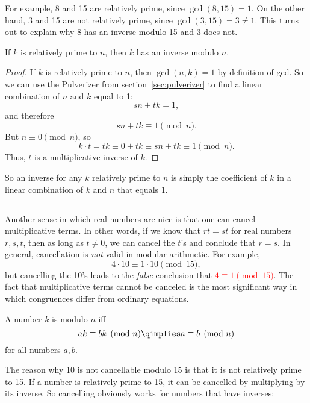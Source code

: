For example, 8 and 15 are relatively prime, since $\gcd(8, 15) = 1$.
On the other hand, 3 and 15 are not relatively prime, since $\gcd(3,
15) = 3 \neq 1$.  This turns out to explain why 8 has an inverse
modulo 15 and 3 does not.

\begin{lemma}\label{lem:inverse-arb} If $k$ is relatively prime to
$n$, then $k$ has an inverse modulo $n$.
\end{lemma}

\begin{proof}
If $k$ is relatively prime to $n$, then $\gcd(n, k) = 1$ by definition
of gcd.  So we can use the Pulverizer from section~\ref{sec:pulverizer} to find
a linear combination of $n$ and $k$ equal to 1:
\[
s n + t k = 1,
\]
and therefore
\[
s n + t k \equiv 1 \pmod{n}.
\]
But $n \equiv 0 \pmod{n}$, so
\[
k \cdot t = tk \equiv 0 + tk \equiv sn +tk \equiv 1 \pmod{n}.
\]
Thus, $t$ is a multiplicative inverse of $k$.
\end{proof}

So an inverse for any $k$ relatively prime to $n$ is simply the
coefficient of $k$ in a linear combination of $k$ and $n$ that equals
1.

\subsection{}

Another sense in which real numbers are nice is that one can cancel
multiplicative terms.  In other words, if we know that $r t = s t$ for
real numbers $r,s,t$, then as long as $t \neq 0$, we can cancel the
$t$'s and conclude that $r = s$.  In general, cancellation is
\emph{not} valid in modular arithmetic.  For example,
\[
4 \cdot 10 \equiv 1 \cdot 10 \pmod{15},
\]
but cancelling the 10's leads to the \emph{false} conclusion that
\textcolor{red}{$4 \equiv 1 \pmod{15}$}.  The fact that multiplicative
terms cannot be canceled is the most significant way in which
congruences differ from ordinary equations.  

\begin{definition}
A number $k$ is  modulo $n$ iff
\[
a k \equiv b k \pmod{n} \qimplies a \equiv b \pmod{n}
\]
for all numbers $a,b$.
\end{definition}

The reason why 10 is not cancellable modulo 15 is that it is not
relatively prime to 15.  If a number is relatively prime to 15, it can
be cancelled by multiplying by its inverse.  So cancelling obviously
works for numbers that have inverses:

